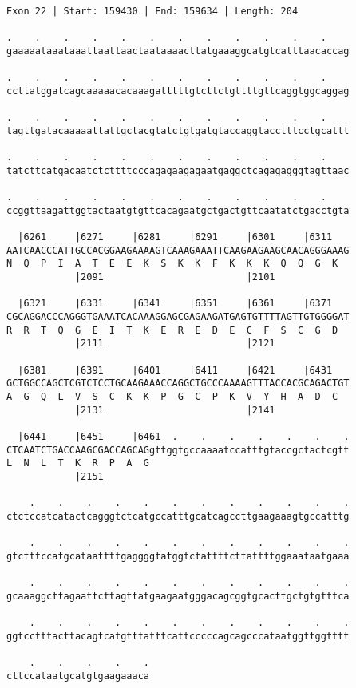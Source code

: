 \documentclass{article}
\begin{document}
\begin{Verbatim}
Exon 22 | Start: 159430 | End: 159634 | Length: 204
 
.    .    .    .    .    .    .    .    .    .    .    .    
gaaaaataaataaattaattaactaataaaacttatgaaaggcatgtcatttaacaccag
  
.    .    .    .    .    .    .    .    .    .    .    .    
ccttatggatcagcaaaaacacaaagatttttgtcttctgttttgttcaggtggcaggag
  
.    .    .    .    .    .    .    .    .    .    .    .    
tagttgatacaaaaattattgctacgtatctgtgatgtaccaggtacctttcctgcattt
  
.    .    .    .    .    .    .    .    .    .    .    .    
tatcttcatgacaatctcttttcccagagaagagaatgaggctcagagagggtagttaac
  
.    .    .    .    .    .    .    .    .    .    .    .    
ccggttaagattggtactaatgtgttcacagaatgctgactgttcaatatctgacctgta
  
  |6261     |6271     |6281     |6291     |6301     |6311   
AATCAACCCATTGCCACGGAAGAAAAGTCAAAGAAATTCAAGAAGAAGCAACAGGGAAAG
N  Q  P  I  A  T  E  E  K  S  K  K  F  K  K  K  Q  Q  G  K  
            |2091                         |2101             
  
  |6321     |6331     |6341     |6351     |6361     |6371   
CGCAGGACCCAGGGTGAAATCACAAAGGAGCGAGAAGATGAGTGTTTTAGTTGTGGGGAT
R  R  T  Q  G  E  I  T  K  E  R  E  D  E  C  F  S  C  G  D  
            |2111                         |2121             
  
  |6381     |6391     |6401     |6411     |6421     |6431   
GCTGGCCAGCTCGTCTCCTGCAAGAAACCAGGCTGCCCAAAAGTTTACCACGCAGACTGT
A  G  Q  L  V  S  C  K  K  P  G  C  P  K  V  Y  H  A  D  C  
            |2131                         |2141             
  
  |6441     |6451     |6461  .    .    .    .    .    .    .
CTCAATCTGACCAAGCGACCAGCAGgttggtgccaaaatccatttgtaccgctactcgtt
L  N  L  T  K  R  P  A  G                                   
            |2151                                           
  
    .    .    .    .    .    .    .    .    .    .    .    .
ctctccatcatactcagggtctcatgccatttgcatcagccttgaagaaagtgccatttg
  
    .    .    .    .    .    .    .    .    .    .    .    .
gtctttccatgcataattttgaggggtatggtctattttcttattttggaaataatgaaa
  
    .    .    .    .    .    .    .    .    .    .    .    .
gcaaaggcttagaattcttagttatgaagaatgggacagcggtgcacttgctgtgtttca
  
    .    .    .    .    .    .    .    .    .    .    .    .
ggtcctttacttacagtcatgtttatttcattcccccagcagcccataatggttggtttt
  
    .    .    .    .    .
cttccataatgcatgtgaagaaaca
\end{Verbatim}
\end{document}
